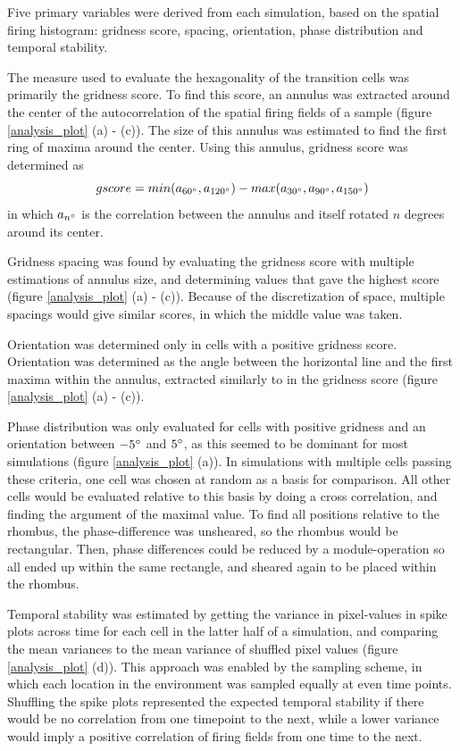 \documentclass{article}
\begin{document}
    Five primary variables were derived from each simulation, based on the spatial firing histogram: gridness score, spacing, orientation, phase distribution and temporal stability.
    
    The measure used to evaluate the hexagonality of the transition cells was primarily the gridness score. To find this score, an annulus was extracted around the center of the autocorrelation of the spatial firing fields of a sample (figure \ref{analysis_plot} (a) - (c)). The size of this annulus was estimated to find the first ring of maxima around the center. Using this annulus, gridness score was determined as \[gscore = min(a_{60\degree}, a_{120\degree}) - max(a_{30\degree}, a_{90\degree}, a_{150\degree})\] in which \(a_{n\degree}\) is the correlation between the annulus and itself rotated \(n\) degrees around its center.

    Gridness spacing was found by evaluating the gridness score with multiple estimations of annulus size, and determining values that gave the highest score (figure \ref{analysis_plot} (a) - (c)). Because of the discretization of space, multiple spacings would give similar scores, in which the middle value was taken.

    Orientation was determined only in cells with a positive gridness score. Orientation was determined as the angle between the horizontal line and the first maxima within the annulus, extracted similarly to in the gridness score (figure \ref{analysis_plot} (a) - (c)).

    Phase distribution was only evaluated for cells with positive gridness and an orientation between \(-5\degree\) and \(5\degree\), as this seemed to be dominant for most simulations (figure \ref{analysis_plot} (a)). In simulations with multiple cells passing these criteria, one cell was chosen at random as a basis for comparison. All other cells would be evaluated relative to this basis by doing a cross correlation, and finding the argument of the maximal value. To find all positions relative to the rhombus, the phase-difference was unsheared, so the rhombus would be rectangular. Then, phase differences could be reduced by a module-operation so all ended up within the same rectangle, and sheared again to be placed within the rhombus.
    
    Temporal stability was estimated by getting the variance in pixel-values in spike plots across time for each cell in the latter half of a simulation, and comparing the mean variances to the mean variance of shuffled pixel values (figure \ref{analysis_plot} (d)). This approach was enabled by the sampling scheme, in which each location in the environment was sampled equally at even time points. Shuffling the spike plots represented the expected temporal stability if there would be no correlation from one timepoint to the next, while a lower variance would imply a positive correlation of firing fields from one time to the next.
\end{document}
